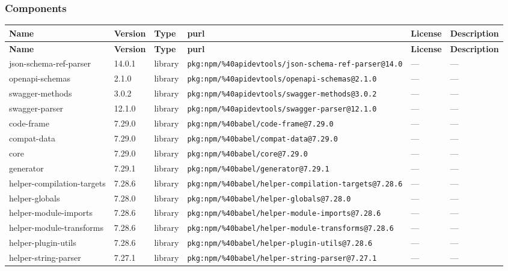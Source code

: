 \documentclass[11pt]{article}
\begin{document}
\subsubsection*{Components}
\begin{longtable}{|l|l|l|p{2.2cm}|l|p{4cm}|}
\hline
\textbf{Name} & \textbf{Version} & \textbf{Type} & \textbf{purl} & \textbf{License} & \textbf{Description} \\
\hline
\endfirsthead
\hline
\textbf{Name} & \textbf{Version} & \textbf{Type} & \textbf{purl} & \textbf{License} & \textbf{Description} \\
\hline
\endhead
json-schema-ref-parser & 14.0.1 & library & \texttt{pkg:npm/\%40apidevtools/json-schema-ref-parser@14.0} & — & — \\
openapi-schemas & 2.1.0 & library & \texttt{pkg:npm/\%40apidevtools/openapi-schemas@2.1.0} & — & — \\
swagger-methods & 3.0.2 & library & \texttt{pkg:npm/\%40apidevtools/swagger-methods@3.0.2} & — & — \\
swagger-parser & 12.1.0 & library & \texttt{pkg:npm/\%40apidevtools/swagger-parser@12.1.0} & — & — \\
code-frame & 7.29.0 & library & \texttt{pkg:npm/\%40babel/code-frame@7.29.0} & — & — \\
compat-data & 7.29.0 & library & \texttt{pkg:npm/\%40babel/compat-data@7.29.0} & — & — \\
core & 7.29.0 & library & \texttt{pkg:npm/\%40babel/core@7.29.0} & — & — \\
generator & 7.29.1 & library & \texttt{pkg:npm/\%40babel/generator@7.29.1} & — & — \\
helper-compilation-targets & 7.28.6 & library & \texttt{pkg:npm/\%40babel/helper-compilation-targets@7.28.6} & — & — \\
helper-globals & 7.28.0 & library & \texttt{pkg:npm/\%40babel/helper-globals@7.28.0} & — & — \\
helper-module-imports & 7.28.6 & library & \texttt{pkg:npm/\%40babel/helper-module-imports@7.28.6} & — & — \\
helper-module-transforms & 7.28.6 & library & \texttt{pkg:npm/\%40babel/helper-module-transforms@7.28.6} & — & — \\
helper-plugin-utils & 7.28.6 & library & \texttt{pkg:npm/\%40babel/helper-plugin-utils@7.28.6} & — & — \\
helper-string-parser & 7.27.1 & library & \texttt{pkg:npm/\%40babel/helper-string-parser@7.27.1} & — & — \\

\end{longtable}
\end{document}
